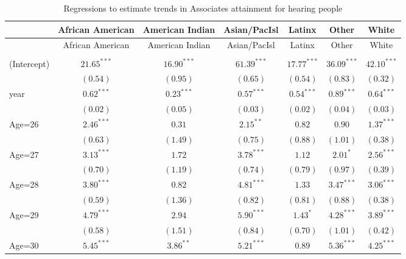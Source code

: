 \documentclass[fullpage]{paper}
\begin{document}
\begin{center}
\begin{longtable}{l c c c c c c }
\hline
 & African American & American Indian & Asian/PacIsl & Latinx & Other & White \\
\hline
\endfirsthead
\hline
 & African American & American Indian & Asian/PacIsl & Latinx & Other & White \\
\hline
\endhead
\hline
\endfoot
\hline
\multicolumn{7}{l}{\scriptsize{$^{***}p<0.001$, $^{**}p<0.01$, $^*p<0.05$}}\\
\caption{Regressions to estimate trends in Associates attainment for hearing people}
\label{table:coefficients}
\endlastfoot
(Intercept) & $21.65^{***}$ & $16.90^{***}$ & $61.39^{***}$  & $17.77^{***}$ & $36.09^{***}$ & $42.10^{***}$ \\
            & $(0.54)$      & $(0.95)$      & $(0.65)$       & $(0.54)$      & $(0.83)$      & $(0.32)$      \\
year        & $0.62^{***}$  & $0.23^{***}$  & $0.57^{***}$   & $0.54^{***}$  & $0.89^{***}$  & $0.64^{***}$  \\
            & $(0.02)$      & $(0.05)$      & $(0.03)$       & $(0.02)$      & $(0.04)$      & $(0.03)$      \\
Age=26      & $2.46^{***}$  & $0.31$        & $2.15^{**}$    & $0.82$        & $0.90$        & $1.37^{***}$  \\
            & $(0.63)$      & $(1.49)$      & $(0.75)$       & $(0.88)$      & $(1.01)$      & $(0.38)$      \\
Age=27      & $3.13^{***}$  & $1.72$        & $3.78^{***}$   & $1.12$        & $2.01^{*}$    & $2.56^{***}$  \\
            & $(0.70)$      & $(1.19)$      & $(0.74)$       & $(0.79)$      & $(0.97)$      & $(0.39)$      \\
Age=28      & $3.80^{***}$  & $0.82$        & $4.81^{***}$   & $1.33$        & $3.47^{***}$  & $3.06^{***}$  \\
            & $(0.59)$      & $(1.36)$      & $(0.82)$       & $(0.81)$      & $(0.88)$      & $(0.38)$      \\
Age=29      & $4.79^{***}$  & $2.94$        & $5.90^{***}$   & $1.43^{*}$    & $4.28^{***}$  & $3.89^{***}$  \\
            & $(0.58)$      & $(1.51)$      & $(0.84)$       & $(0.70)$      & $(1.01)$      & $(0.42)$      \\
Age=30      & $5.45^{***}$  & $3.86^{**}$   & $5.21^{***}$   & $0.89$        & $5.36^{***}$  & $4.25^{***}$  \\

\end{longtable}
\end{center}
\end{document}
